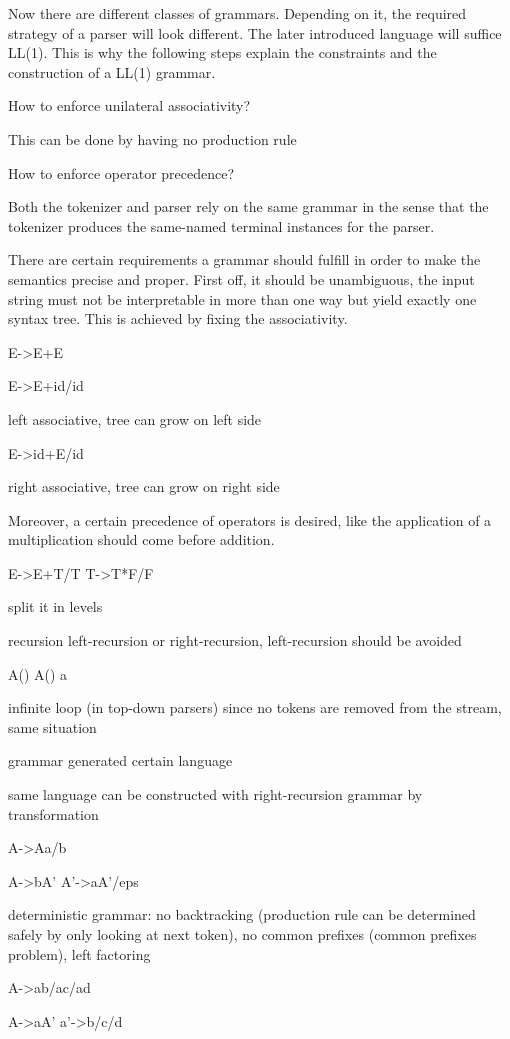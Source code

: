 Now there are different classes of grammars. Depending on it, the required strategy of a parser will look different. The later introduced language will suffice LL(1). This is why the following steps explain the constraints and the construction of a LL(1) grammar.

How to enforce unilateral associativity?

This can be done by having no production rule 

How to enforce operator precedence?

Both the tokenizer and parser rely on the same grammar in the sense that the tokenizer produces the same-named terminal instances for the parser.

There are certain requirements a grammar should fulfill in order to make the semantics precise and proper. First off, it should be unambiguous, the input string must not be interpretable in more than one way but yield exactly one syntax tree. This is achieved by fixing the associativity.

E->E+E

E->E+id/id

left associative, tree can grow on left side

E->id+E/id

right associative, tree can grow on right side

Moreover, a certain precedence of operators is desired, like the application of a multiplication should come before addition.

E->E+T/T
T->T*F/F

split it in levels 

recursion left-recursion or right-recursion, left-recursion should be avoided

A()
{
	A()
	a
}

infinite loop (in top-down parsers) since no tokens are removed from the stream, same situation

grammar generated certain language

same language can be constructed with right-recursion grammar by transformation

A->Aa/b

A->bA'
A'->aA'/eps

deterministic grammar: no backtracking (production rule can be determined safely by only looking at next token), no common prefixes (common prefixes problem), left factoring

A->ab/ac/ad

A->aA'
a'->b/c/d

